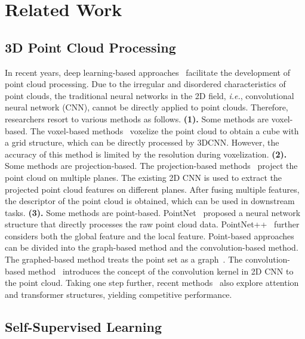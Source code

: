 \documentclass[journal]{IEEEtran}
\def\ie{\emph{i.e.}}
\begin{document}
\section{Related Work}\label{sec:related}

\subsection{3D Point Cloud Processing}
In recent years, deep learning-based approaches~\cite{wang20183d, yi2017large, meng2021towards, chen2020pointmixup} facilitate the development of point cloud processing. Due to the irregular and disordered characteristics of point clouds, the traditional neural networks in the 2D field, \ie, convolutional neural network (CNN), cannot be directly applied to point clouds. Therefore, researchers resort to various methods as follows.  \textbf{(1).} Some methods are voxel-based. The voxel-based methods~\cite{maturana2015voxnet, wu20153d} voxelize the point cloud to obtain a cube with a grid structure, which can be directly processed by 3DCNN. However, the accuracy of this method is limited by the resolution during voxelization. \textbf{(2).} Some methods are projection-based. The projection-based methods~\cite{su2015multi, li2020auto, zhang2020polarnet} project the point cloud on multiple planes. The existing 2D CNN is used to extract the projected point cloud features on different planes. After fusing multiple features, the descriptor of the point cloud is obtained, which can be used in downstream tasks.  
\textbf{(3).} Some methods are point-based. PointNet~\cite{qi2017pointnet} proposed a neural network structure that directly processes the raw point cloud data. PointNet++~\cite{qi2017pointnet++} further considers both the global feature and the local feature. Point-based approaches can be divided into the graph-based method and the convolution-based method. The graphed-based method treats the point set as a graph~\cite{kipf2016semi, hu2020randla, wang2019dynamic}. The convolution-based method~\cite{thomas2019kpconv, xu2021paconv} introduces the concept of the convolution kernel in 2D CNN to the point cloud. Taking one step further, recent methods~\cite{guo2021pct,zhao2021point} also explore attention and transformer structures, yielding competitive performance. 

  \subsection{Self-Supervised Learning}
    
\end{document}
